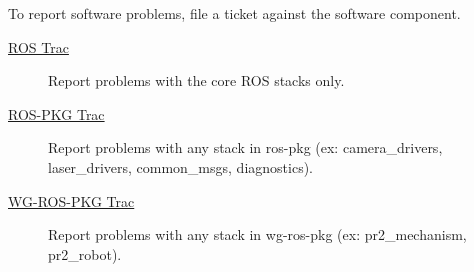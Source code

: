 To report software problems, file a ticket against the software component.

\begin{description}
\item[\href{https://code.ros.org/trac/ros/newticket}{ROS Trac}] Report problems with the core ROS stacks only.

\item[\href{https://code.ros.org/trac/ros-pkg/newticket}{ROS-PKG Trac}] Report problems with any stack in ros-pkg (ex: camera\_drivers, laser\_drivers, common\_msgs, diagnostics).

\item[\href{https://code.ros.org/trac/wg-ros-pkg/newticket}{WG-ROS-PKG Trac}] Report problems with any stack in wg-ros-pkg (ex: pr2\_mechanism, pr2\_robot).
\end{description}

